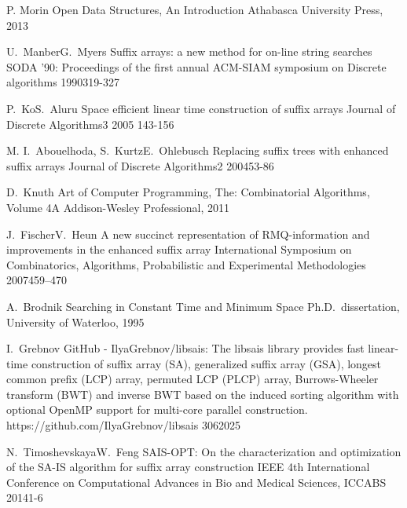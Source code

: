 \knjigaEnAvtor
    {P. Morin}
    {Open Data Structures, An Introduction}
    {Athabasca University Press, 2013}

\konferencniClanekVecAvtorjev
    {U.~Manber}{G.~Myers}
    {Suffix arrays: a new method for on-line string searches}
    {SODA '90: Proceedings of the first annual ACM-SIAM symposium on Discrete algorithms}
    {1990}{319-327}

\clanekVRevijiVecAvtorjev
    {P.~Ko}{S.~Aluru}
    {Space efficient linear time construction of suffix arrays}
    {Journal of Discrete Algorithms}{3}
    {2005}{ 143-156}

\clanekVRevijiVecAvtorjev
    {M. I.~Abouelhoda, S.~Kurtz}{E.~Ohlebusch}
    {Replacing suffix trees with enhanced suffix arrays}
    {Journal of Discrete Algorithms}{2}
    {2004}{53-86} 

\knjigaEnAvtor
    {D.~Knuth}
    {Art of Computer Programming, The: Combinatorial Algorithms, Volume 4A}
    {Addison-Wesley Professional, 2011}

\konferencniClanekVecAvtorjev
    {J.~Fischer}{V.~Heun}
    {A new succinct representation of RMQ-information and improvements in the enhanced suffix array}
    {International Symposium on Combinatorics, Algorithms, Probabilistic and Experimental Methodologies}
    {2007}{459--470}

\doktorskaDisertacija
    {A.~Brodnik}
    {Searching in Constant Time and Minimum Space}
    {Ph.D.~dissertation, University of Waterloo, 1995}

\spletniVirZAvtorjem
    {I.~Grebnov}
    {GitHub - IlyaGrebnov/libsais: The libsais library provides fast linear-time construction of suffix array (SA), generalized suffix array (GSA), longest common prefix (LCP) array, permuted LCP (PLCP) array, Burrows-Wheeler transform (BWT) and inverse BWT based on the induced sorting algorithm with optional OpenMP support for multi-core parallel construction.}
    {https://github.com/IlyaGrebnov/libsais}
    {30}{6}{2025}

\konferencniClanekVecAvtorjev
    {N.~Timoshevskaya}{W.~Feng}
    {SAIS-OPT: On the characterization and optimization of the SA-IS algorithm for suffix array construction}
    {IEEE 4th International Conference on Computational Advances in Bio and Medical Sciences, ICCABS}
    {2014}{1-6}



